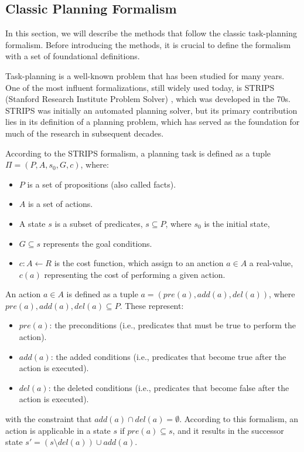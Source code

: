 \subsection{Classic Planning Formalism}
\label{sec:pddl_formalism}
In this section, we will describe the methods that follow the classic task-planning formalism. Before introducing the methods, it is crucial to define the formalism with a set of foundational definitions.

Task-planning is a well-known problem that has been studied for many years. One of the most influent formalizations, still widely used today, is STRIPS (Stanford Research Institute Problem Solver) \cite{fikes1971strips}, which was developed in the 70s. STRIPS was initially an automated planning solver, but its primary contribution lies in its definition of a planning problem, which has served as the foundation for much of the research in subsequent decades.

According to the STRIPS formalism, a planning task is defined as a tuple $\Pi = (P, A, s_0, G, c)$, where:
\begin{itemize}
    \item $P$ is a set of propositions (also called facts).
    \item $A$ is a set of actions.
    \item A state $s$ is a subset of predicates, $s \subseteq P$, where $s_0$ is the initial state,
    \item $G \subseteq s$ represents the goal conditions.
    \item $c: A \leftarrow R$ is the cost function, which assign to an anction $a \in A$ a real-value, $c(a)$ representing the cost of performing a given action.
\end{itemize}

An action $a \in A$ is defined as a tuple $a = \left(pre(a), add(a), del(a)\right)$, where $pre(a), add(a), del(a) \subseteq P$. These represent:
\begin{itemize}
    \item $pre(a)$: the preconditions (i.e., predicates that must be true to perform the action).
    \item $add(a)$: the added conditions (i.e., predicates that become true after the action is executed).
    \item $del(a)$: the deleted conditions (i.e., predicates that become false after the action is executed).
\end{itemize}
with the constraint that $add(a) \cap del(a) = \emptyset$. According to this formalism, an action is applicable in a state $s$ if $pre(a) \subseteq s$, and it results in the successor state $s' = (s \setminus del(a)) \cup add(a)$.

